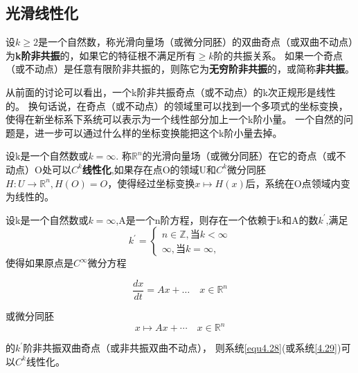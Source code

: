 \subsection{光滑线性化}
\begin{defination}
  设\(k \geqslant 2\)是一个自然数，称光滑向量场（或微分同胚）的双曲奇点（或双曲不动点）为\textbf{k阶非共振}的，如果它的特征根不满足所有\(\geqslant k\)阶的共振关系。
  如果一个奇点（或不动点）是任意有限阶非共振的，则陈它为\textbf{无穷阶非共振}的，或简称\textbf{非共振}。
  \label{def:1.4.16}
\end{defination}

从前面的讨论可以看出，一个k阶非共振奇点（或不动点）的k次正规形是线性的。
换句话说，在奇点（或不动点）的领域里可以找到一个多项式的坐标变换，使得在新坐标系下系统可以表示为一个线性部分加上一个k阶小量。
一个自然的问题是，进一步可以通过什么样的坐标变换能把这个k阶小量去掉。

\begin{defination}
  设k是一个自然数或\(k=\infty\).
  称\(\mathbb{R}^n\)的光滑向量场（或微分同胚）在它的奇点（或不动点）O处可以\(C^k\)\textbf{线性化},如果存在点O的领域U和\(C^k\)微分同胚$H : U \rightarrow \mathbb { R } ^ { n } , H ( O ) = O$，使得经过坐标变换$x \mapsto H ( x )$后，系统在O点领域内变为线性的。
\end{defination}

\begin{theorem}[IY]
  设k是一个自然数或\(k=\infty\),A是一个n阶方程，则存在一个依赖于k和A的数\(k^{\prime}\),满足
  \[
    k ^ { \prime } =
    \left\{
      \begin{array} { l }
        { n \in \mathbb { Z } } ,当k < \infty\\
        { \infty },当k= \infty,
      \end{array}
    \right.
  \]
  使得如果原点是\(C^\infty\)微分方程
  
\begin{equation}
\frac { d x } { d t } = A x + \dots \quad x \in \mathbb{R}^{n}
\label{eq:1.4.28}
\end{equation}

  或微分同胚
  \begin{equation}
x \mapsto A x + \cdots \quad x \in \mathbb { R } ^ { n }
    \label{eq:1.4.29}
  \end{equation}
  
  的\(k^\prime\)阶非共振双曲奇点（或非共振双曲不动点），
  则系统\ref{equ4.28}(或系统\ref{4.29})可以\(C^k\)线性化。  
\end{theorem}

